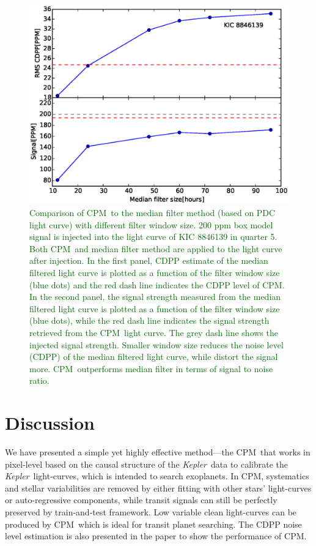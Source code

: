 \documentclass[12pt, preprint]{aastex}
\newcommand{\project}[1]{\textsl{#1}}
\newcommand{\Kepler}{\project{Kepler}}
\newcommand{\name}{CPM}
\newcommand{\revise}[1]{\textcolor{darkgreen}{#1}}
\begin{document}
\begin{figure}[p]
\begin{center}
\includegraphics[width=\textwidth]{f7a}
\end{center}
\caption{
  \label{filter} 
\revise{Comparison of \name\ to the median filter method (based on PDC light curve) with different filter window size. 200 ppm box model signal is injected into the light curve of KIC 8846139 in quarter 5. Both \name\ and median filter method are applied to the light curve after injection. In the first panel, CDPP estimate of the median filtered light curve is plotted as a function of the filter window size (blue dots) and the red dash line indicates the CDPP level of CPM. In the second panel, the signal strength measured from the median filtered light curve is plotted as a function of the filter window size (blue dots), while the red dash line indicates the signal strength retrieved from the \name\ light curve. The grey dash line shows the injected signal strength. Smaller window size reduces the noise level (CDPP) of the median filtered light curve, while distort the signal more. \name\ outperforms median filter in terms of signal to noise ratio.}
}
\end{figure}

\section{Discussion}
We have presented a simple yet highly effective method---the \name\ that works in pixel-level 
  based on the causal structure of the \Kepler\ data to calibrate the \Kepler\ light-curves, 
  which is intended to search exoplanets.
In \name, systematics and stellar variabilities are removed by
  either fitting with other stars' light-curves or auto-regressive components,
  while transit signals can still be perfectly preserved by train-and-test framework.
Low variable clean light-curves can be produced by \name\,  
  which is ideal for transit planet searching. 
The CDPP noise level estimation is also presented in the paper to show the performance of \name. 
\end{document}
